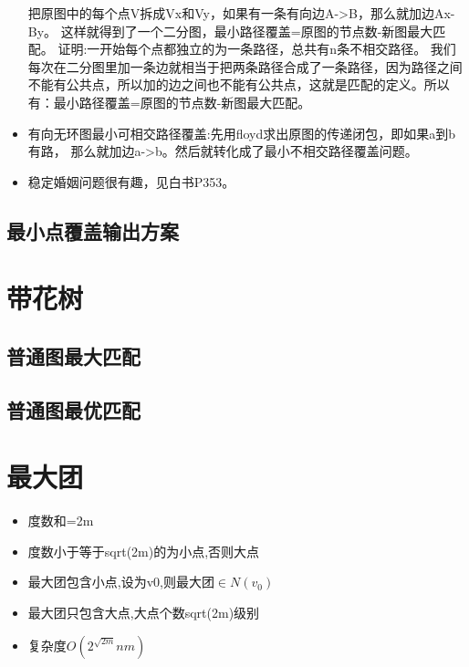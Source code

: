 \documentclass[landscape]{report}
\newcommand{\includecode}[2][c]{}
\begin{document}
\begin{flushleft}
\begin{multicols}{2}
\begin{itemize}
把原图中的每个点V拆成Vx和Vy，如果有一条有向边A->B，那么就加边Ax-By。 这样就得到了一个二分图，最小路径覆盖=原图的节点数-新图最大匹配。
证明:一开始每个点都独立的为一条路径，总共有n条不相交路径。
我们每次在二分图里加一条边就相当于把两条路径合成了一条路径，因为路径之间不能有公共点，所以加的边之间也不能有公共点，这就是匹配的定义。所以有：最小路径覆盖=原图的节点数-新图最大匹配。

\item 有向无环图最小可相交路径覆盖:先用floyd求出原图的传递闭包，即如果a到b有路， 那么就加边a->b。然后就转化成了最小不相交路径覆盖问题。
\item  稳定婚姻问题很有趣，见白书P353。
\end{itemize}
\subsection{ 最小点覆盖输出方案}
\includecode[c++]{uva11419.cpp}
\section{ 带花树}
\subsection{ 普通图最大匹配 }
\includecode[c++]{ural1099.cpp}
\subsection{ 普通图最优匹配}
\includecode[c++]{uoj81.cpp}
\section{ 最大团}
\begin{itemize}
\item 度数和=2m
\item 度数小于等于sqrt(2m)的为小点,否则大点
\item 最大团包含小点,设为v0,则最大团$\in N(v_0)$
\item 最大团只包含大点,大点个数sqrt(2m)级别
\item 复杂度$O(2^{\sqrt{2m}}nm)$
\end{itemize}

\end{multicols}
\end{flushleft}
\end{document}
